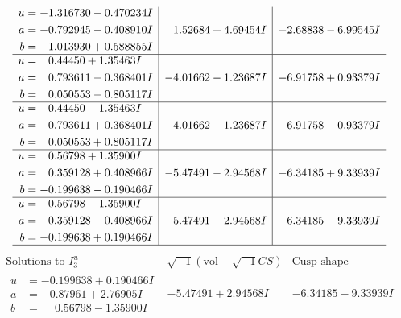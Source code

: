 \documentclass[1p]{elsarticle_modified}
\theoremstyle{definition}
\newcommand{\I}{\sqrt{-1}}
\begin{document}
$$\begin{array}{c|c|c}
\begin{aligned}
u &= -1.316730 - 0.470234 I \\
a &= -0.792945 - 0.408910 I \\
b &= \phantom{-}1.013930 + 0.588855 I\end{aligned}
 & \phantom{-}1.52684 + 4.69454 I & -2.68838 - 6.99545 I \\ \hline\begin{aligned}
u &= \phantom{-}0.44450 + 1.35463 I \\
a &= \phantom{-}0.793611 - 0.368401 I \\
b &= \phantom{-}0.050553 - 0.805117 I\end{aligned}
 & -4.01662 - 1.23687 I & -6.91758 + 0.93379 I \\ \hline\begin{aligned}
u &= \phantom{-}0.44450 - 1.35463 I \\
a &= \phantom{-}0.793611 + 0.368401 I \\
b &= \phantom{-}0.050553 + 0.805117 I\end{aligned}
 & -4.01662 + 1.23687 I & -6.91758 - 0.93379 I \\ \hline\begin{aligned}
u &= \phantom{-}0.56798 + 1.35900 I \\
a &= \phantom{-}0.359128 + 0.408966 I \\
b &= -0.199638 - 0.190466 I\end{aligned}
 & -5.47491 - 2.94568 I & -6.34185 + 9.33939 I \\ \hline\begin{aligned}
u &= \phantom{-}0.56798 - 1.35900 I \\
a &= \phantom{-}0.359128 - 0.408966 I \\
b &= -0.199638 + 0.190466 I\end{aligned}
 & -5.47491 + 2.94568 I & -6.34185 - 9.33939 I\\
 \hline 
 \end{array}$$\newpage$$\begin{array}{c|c|c}  
\text{Solutions to }I^u_{3}& \I (\text{vol} + \sqrt{-1}CS) & \text{Cusp shape}\\
 \hline 
\begin{aligned}
u &= -0.199638 + 0.190466 I \\
a &= -0.87961 + 2.76905 I \\
b &= \phantom{-}0.56798 - 1.35900 I\end{aligned}
 & -5.47491 + 2.94568 I & -6.34185 - 9.33939 I \\ \hline\begin{aligned}

\end{aligned}
\end{array}$$
\end{document}
